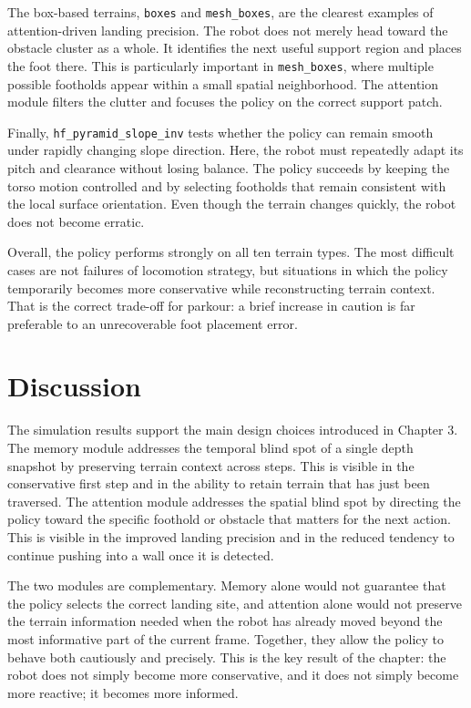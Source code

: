The box-based terrains, \texttt{boxes} and \texttt{mesh\_boxes}, are the clearest examples of attention-driven landing precision. The robot does not merely head toward the obstacle cluster as a whole. It identifies the next useful support region and places the foot there. This is particularly important in \texttt{mesh\_boxes}, where multiple possible footholds appear within a small spatial neighborhood. The attention module filters the clutter and focuses the policy on the correct support patch.

Finally, \texttt{hf\_pyramid\_slope\_inv} tests whether the policy can remain smooth under rapidly changing slope direction. Here, the robot must repeatedly adapt its pitch and clearance without losing balance. The policy succeeds by keeping the torso motion controlled and by selecting footholds that remain consistent with the local surface orientation. Even though the terrain changes quickly, the robot does not become erratic.

Overall, the policy performs strongly on all ten terrain types. The most difficult cases are not failures of locomotion strategy, but situations in which the policy temporarily becomes more conservative while reconstructing terrain context. That is the correct trade-off for parkour: a brief increase in caution is far preferable to an unrecoverable foot placement error.

\section{Discussion}
\label{sec:discussion}

The simulation results support the main design choices introduced in Chapter 3. The memory module addresses the temporal blind spot of a single depth snapshot by preserving terrain context across steps. This is visible in the conservative first step and in the ability to retain terrain that has just been traversed. The attention module addresses the spatial blind spot by directing the policy toward the specific foothold or obstacle that matters for the next action. This is visible in the improved landing precision and in the reduced tendency to continue pushing into a wall once it is detected.

The two modules are complementary. Memory alone would not guarantee that the policy selects the correct landing site, and attention alone would not preserve the terrain information needed when the robot has already moved beyond the most informative part of the current frame. Together, they allow the policy to behave both cautiously and precisely. This is the key result of the chapter: the robot does not simply become more conservative, and it does not simply become more reactive; it becomes more informed.

